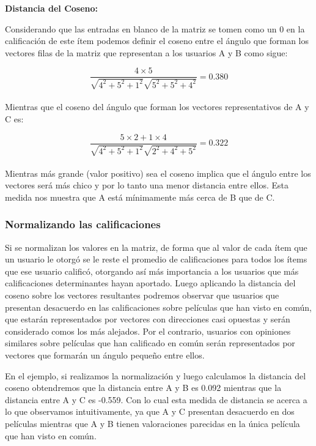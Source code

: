 	\textbf{Distancia del Coseno:} \par
	Considerando que las entradas en blanco de la matriz se tomen como un 0 en la calificación de este ítem podemos definir el coseno entre el ángulo que forman los vectores filas de la matriz que representan a los usuarios A y B como sigue:
	
	\begin{equation}
	\frac{ 4 \times 5}{\sqrt{4^2 + 5^2 + 1^2} \sqrt{5^2 + 5^2 + 4^2}} = 0.380
	\end{equation}	\\
				
Mientras que el coseno del ángulo que forman los vectores representativos de A y C es:
 	
 	\begin{equation}
	\frac{ 5 \times 2 + 1 \times 4}{\sqrt{4^2 + 5^2 + 1^2} \sqrt{2^2 + 4^2 + 5^2}} = 0.322
	\end{equation}	\\
	
	
Mientras más grande (valor positivo) sea el coseno implica que el ángulo entre los vectores será más chico y por lo tanto una menor distancia entre ellos. Esta medida nos muestra que A está mínimamente más cerca de B que de C. \\

\subsubsection{Normalizando las calificaciones}

Si se normalizan los valores en la matriz, de forma que al valor de cada ítem que un usuario le otorgó se le reste el promedio de calificaciones para todos los ítems que ese usuario calificó, otorgando así más importancia a los usuarios que más calificaciones determinantes hayan aportado. Luego aplicando la distancia del coseno sobre los vectores resultantes podremos observar que usuarios que presentan desacuerdo en las calificaciones sobre películas que han visto en común, que estarán representados por vectores con direcciones casi opuestas y serán considerado comos los más alejados. Por el contrario, usuarios con opiniones similares sobre películas que han calificado en común serán representados por vectores que formarán un ángulo pequeño entre ellos. \par

En el ejemplo, si realizamos la normalización y luego calculamos la distancia del coseno obtendremos que la distancia entre A y B es 0.092 mientras que la distancia entre A y C es -0.559. Con lo cual esta medida de distancia se acerca a lo que observamos intuitivamente, ya que A y C presentan desacuerdo en dos películas mientras que A y B tienen valoraciones parecidas en la única película que han visto en común.

